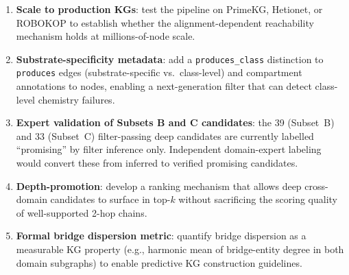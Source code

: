 \begin{enumerate}[noitemsep]
\item \textbf{Scale to production KGs}: test the pipeline on PrimeKG, Hetionet,
  or ROBOKOP to establish whether the alignment-dependent reachability
  mechanism holds at millions-of-node scale.

\item \textbf{Substrate-specificity metadata}: add a \texttt{produces\_class}
  distinction to \texttt{produces} edges (substrate-specific vs.\ class-level)
  and compartment annotations to nodes, enabling a next-generation filter that
  can detect class-level chemistry failures.

\item \textbf{Expert validation of Subsets B and C candidates}: the 39 (Subset~B)
  and 33 (Subset~C) filter-passing deep candidates are currently labelled
  ``promising'' by filter inference only.
  Independent domain-expert labeling would convert these from inferred to
  verified promising candidates.

\item \textbf{Depth-promotion}: develop a ranking mechanism that allows deep
  cross-domain candidates to surface in top-$k$ without sacrificing the scoring
  quality of well-supported 2-hop chains.

\item \textbf{Formal bridge dispersion metric}: quantify bridge dispersion as
  a measurable KG property (e.g., harmonic mean of bridge-entity degree in
  both domain subgraphs) to enable predictive KG construction guidelines.
\end{enumerate}
